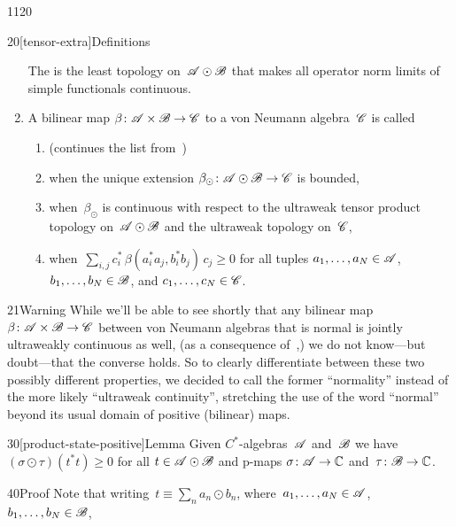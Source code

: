 \begin{parsec}{1120}
\begin{point}{20}[tensor-extra]{Definitions}
\begin{enumerate}
The %
is the least topology on~$\mathscr{A}\odot\mathscr{B}$
that makes all operator norm limits
of simple functionals continuous.
\item
A bilinear map $\beta\colon \mathscr{A}\times \mathscr{B}\to\mathscr{C}$
to a von Neumann algebra~$\mathscr{C}$
is called
\begin{enumerate}
\item
(continues the list from~)
\item
{}%
when the unique extension $\beta_\odot \colon \mathscr{A}\odot \mathscr{B}\to \mathscr{C}$
is bounded,
\item 
{}%
%
when~$\beta_\odot$
is continuous with respect to the ultraweak tensor product topology 
on~$\mathscr{A}\odot\mathscr{B}$
and the ultraweak topology on~$\mathscr{C}$,
\item
{}%
%
%
when~$\sum_{i,j}c_i^*\,\beta(a_i^*a_j,b_i^*b_j)\,c_j\geq 0$
for all tuples $a_1,\dotsc,a_N\in\mathscr{A}$,
$b_1,\dotsc,b_N\in\mathscr{B}$,
and $c_1,\dotsc,c_N\in\mathscr{C}$.
\end{enumerate}
\end{enumerate}
\spacingfix%
\begin{point}{21}{Warning}%
While we'll be able to see shortly that any bilinear map
$\beta\colon \mathscr{A}\times\mathscr{B}\to\mathscr{C}$
between von Neumann algebras
that is normal
is jointly ultraweakly continuous as well,
(as a consequence of~,)
we do not know---but doubt---that the converse holds.
So to clearly differentiate between these two possibly different properties,
we decided to call the former ``normality'' instead of 
    the more likely ``ultraweak continuity'',
stretching the use of the word ``normal'' beyond its usual 
    domain of positive (bilinear) maps.
\end{point}
\end{point}
\begin{point}{30}[product-state-positive]{Lemma}%
Given $C^*$-algebras~$\mathscr{A}$ and~$\mathscr{B}$
we have~$(\sigma\odot \tau) (t^*t)\geq 0$
for all  $t\in\mathscr{A}\odot\mathscr{B}$
and p-maps  $\sigma\colon \mathscr{A}\to\mathbb{C}$
and~$\tau\colon \mathscr{B}\to\mathbb{C}$.
\begin{point}{40}{Proof}%
Note that writing~$t\equiv \sum_n a_n \odot b_n$,
where~$a_1,\dotsc,a_N\in \mathscr{A}$, $b_1,\dotsc,b_N\in \mathscr{B}$,

\end{point}
\end{point}
\end{parsec}
